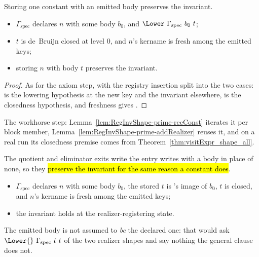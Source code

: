 \begin{lemma}
\label{lem:RegInvShape-prime-constCons}
\leanok
{}
 Storing one constant with an emitted body preserves the invariant.
\begin{itemize}
\item {} $\Gamma_{\mathrm{spec}}$ declares $n$ with some body $b_0$, and $\Lower\ \Gamma_{\mathrm{spec}}\ b_0\ t$;
\item $t$ is de~Bruijn closed at level $0$, and $n$'s kername is fresh among the emitted keys;
\item {} storing $n$ with body $t$ preserves the invariant.
\end{itemize}
\end{lemma}
\begin{proof}
\leanok
{}
 As for the axiom step, with the registry insertion split into the two cases:  is
the lowering hypothesis at the new key and the invariant elsewhere,  is the closedness
hypothesis, and freshness gives .
\end{proof}
\begin{remark}
 The workhorse step: Lemma~\ref{lem:RegInvShape-prime-recConst} iterates it per block member,
Lemma~\ref{lem:RegInvShape-prime-addRealizer} reuses it, and on a real run its closedness premise comes
from Theorem~\ref{thm:visitExpr_shape_all}.
\end{remark}
\begin{lemma}
\label{lem:RegInvShape-prime-addRealizer}
\leanok
{}
 The quotient and eliminator exits write the entry  writes with a body in
place of none, so they \hl{preserve the invariant for the same reason a constant does}.
\begin{itemize}
\item {} $\Gamma_{\mathrm{spec}}$ declares $n$ with some body $b_0$, the stored $t$ is
\Lower{}'s image of $b_0$, $t$ is closed, and $n$'s kername is fresh among the emitted keys;
\item {} the invariant holds at the realizer-registering state.
\end{itemize}
 The emitted body is not assumed to \emph{be} the declared one: that would ask
$\Lower{}\ \Gamma_{\mathrm{spec}}\ t\ t$ of the two realizer shapes and say nothing the general clause
does not.
\end{lemma}
